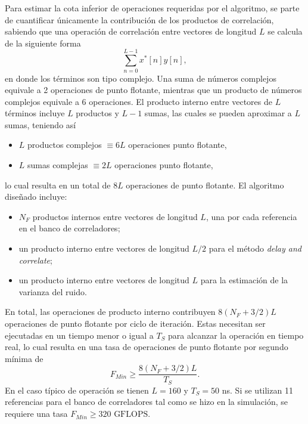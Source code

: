 Para estimar la cota inferior de operaciones requeridas por el algoritmo, se parte de cuantificar únicamente la contribución de los productos de correlación, sabiendo que una operación de correlación entre vectores de longitud $L$ se calcula de la siguiente forma
\begin{equation}
    \sum_{n=0}^{L-1}x^\ast[n]y[n],
\end{equation}
en donde los términos son tipo complejo. Una suma de números complejos equivale a 2 operaciones de punto flotante, mientras que un producto de números complejos equivale a 6 operaciones. El producto interno entre vectores de $L$ términos incluye $L$ productos y $L-1$ sumas, las cuales se pueden aproximar a $L$ sumas, teniendo así
\begin{itemize}
    \item $L$ productos complejos $\equiv 6L$ operaciones punto flotante,
    \item $L$ sumas complejas $\equiv 2L$ operaciones punto flotante,
\end{itemize}
lo cual resulta en un total de $8L$ operaciones de punto flotante. El algoritmo diseñado incluye:
\begin{itemize}
    \item $N_F$ productos internos entre vectores de longitud $L$, una por cada referencia en el banco de correladores;
    \item un producto interno entre vectores de longitud $L/2$ para el método \textit{delay and correlate};
    \item un producto interno entre vectores de longitud $L$ para la estimación de la varianza del ruido.
\end{itemize}
En total, las operaciones de producto interno contribuyen $8(N_F+3/2)L$ operaciones de punto flotante por ciclo de iteración. Estas necesitan ser ejecutadas en un tiempo menor o igual a $T_S$ para alcanzar la operación en tiempo real, lo cual resulta en una tasa de operaciones de punto flotante por segundo mínima de
\begin{equation}
    F_{Min} \ge \frac{8(N_F+3/2)L}{T_S}.
\end{equation}
En el caso típico de operación se tienen $L=160$ y $T_S=50$ ns. Si se utilizan 11 referencias para el banco de correladores tal como se hizo en la simulación, se requiere una tasa $F_{Min}\ge 320\text{ GFLOPS}$. 

